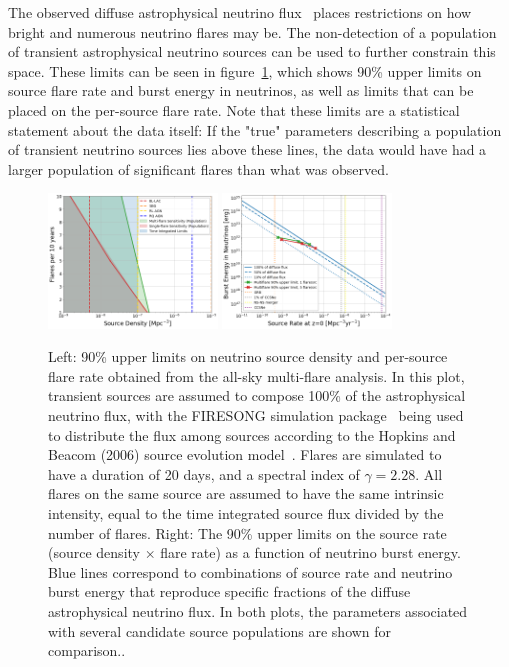 The observed diffuse astrophysical neutrino flux~\cite{stettner2019measurement} places restrictions on how bright and numerous neutrino flares may be. The non-detection of a population of transient astrophysical neutrino sources can be used to further constrain this space. These limits can be seen in figure~\ref{fig:mfskylim}, which shows 90\% upper limits on source flare rate and burst energy in neutrinos, as well as limits that can be placed on the per-source flare rate. Note that these limits are a statistical statement about the data itself: If the "true" parameters describing a population of transient neutrino sources lies above these lines, the data would have had a larger population of significant flares than what was observed. 

\begin{figure}[h]
\centering
\includegraphics[width=0.4\textwidth]{figs/flarelims.png}
\includegraphics[width=0.4\textwidth]{figs/sourceratelims.png}
\caption{Left: 90\% upper limits on neutrino source density and per-source flare rate obtained from the all-sky multi-flare analysis. In this plot, transient sources are assumed to compose 100\% of the astrophysical neutrino flux, with the FIRESONG simulation package~\cite{firesong_ref} being used to distribute the flux among sources according to the Hopkins and Beacom (2006) source evolution model~\cite{Hopkins_2006}. Flares are simulated to have a duration of 20 days, and a spectral index of $\gamma=2.28$. All flares on the same source are assumed to have the same intrinsic intensity, equal to the time integrated source flux divided by the number of flares. Right: The 90\% upper limits on the source rate (source density $\times$ flare rate) as a function of neutrino burst energy. Blue lines correspond to combinations of source rate and neutrino burst energy that reproduce specific fractions of the diffuse astrophysical neutrino flux. In both plots, the parameters associated with several candidate source populations are shown for comparison..}
\label{fig:mfskylim}
\end{figure}


